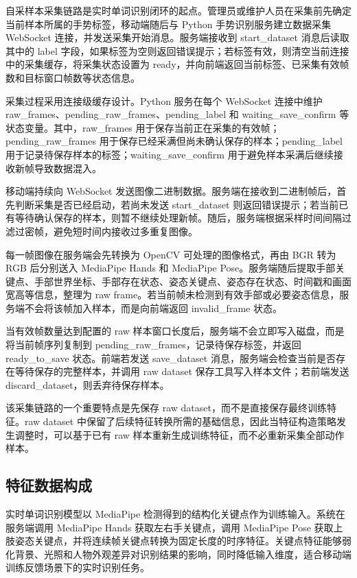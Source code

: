 自采样本采集链路是实时单词识别闭环的起点。管理员或维护人员在采集前先确定当前样本所属的手势标签，移动端随后与 Python 手势识别服务建立数据采集 WebSocket 连接，并发送采集开始消息。服务端接收到 start\_dataset 消息后读取其中的 label 字段，如果标签为空则返回错误提示；若标签有效，则清空当前连接中的采集缓存，将采集状态设置为 ready，并向前端返回当前标签、已采集有效帧数和目标窗口帧数等状态信息。

采集过程采用连接级缓存设计。Python 服务在每个 WebSocket 连接中维护 raw\_frames、pending\_raw\_frames、pending\_label 和 waiting\_save\_confirm 等状态变量。其中，raw\_frames 用于保存当前正在采集的有效帧；pending\_raw\_frames 用于保存已经采满但尚未确认保存的样本；pending\_label 用于记录待保存样本的标签；waiting\_save\_confirm 用于避免样本采满后继续接收新帧导致数据混入。

移动端持续向 WebSocket 发送图像二进制数据。服务端在接收到二进制帧后，首先判断采集是否已经启动，若尚未发送 start\_dataset 则返回错误提示；若当前已有等待确认保存的样本，则暂不继续处理新帧。随后，服务端根据采样时间间隔过滤过密帧，避免短时间内接收过多重复图像。

每一帧图像在服务端会先转换为 OpenCV 可处理的图像格式，再由 BGR 转为 RGB 后分别送入 MediaPipe Hands 和 MediaPipe Pose。服务端随后提取手部关键点、手部世界坐标、手部存在状态、姿态关键点、姿态存在状态、时间戳和画面宽高等信息，整理为 raw frame。若当前帧未检测到有效手部或必要姿态信息，服务端不会将该帧加入样本，而是向前端返回 invalid\_frame 状态。

当有效帧数量达到配置的 raw 样本窗口长度后，服务端不会立即写入磁盘，而是将当前帧序列复制到 pending\_raw\_frames，记录待保存标签，并返回 ready\_to\_save 状态。前端若发送 save\_dataset 消息，服务端会检查当前是否存在等待保存的完整样本，并调用 raw dataset 保存工具写入样本文件；若前端发送 discard\_dataset，则丢弃待保存样本。

该采集链路的一个重要特点是先保存 raw dataset，而不是直接保存最终训练特征。raw dataset 中保留了后续特征转换所需的基础信息，因此当特征构造策略发生调整时，可以基于已有 raw 样本重新生成训练特征，而不必重新采集全部动作样本。

\subsection{特征数据构成}

实时单词识别模型以 MediaPipe 检测得到的结构化关键点作为训练输入。系统在服务端调用 MediaPipe Hands 获取左右手关键点，调用 MediaPipe Pose 获取上肢姿态关键点，并将连续帧关键点转换为固定长度的时序特征。关键点特征能够弱化背景、光照和人物外观差异对识别结果的影响，同时降低输入维度，适合移动端训练反馈场景下的实时识别任务。

